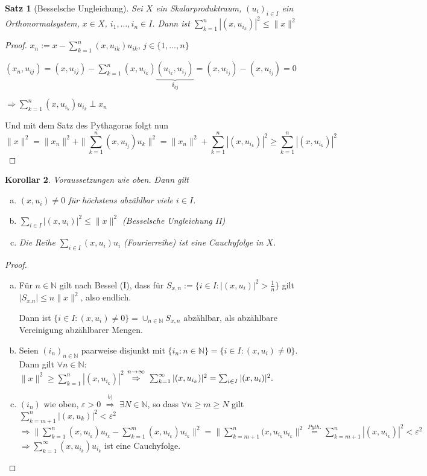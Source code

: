 \documentclass[ngerman]{report}
\theoremstyle{plain}%
\newtheorem{thm}{Satz}[chapter]
\newtheorem{cor}[thm]{Korollar}
\theoremstyle{definition}%
\theoremstyle{myStyle}
\newcommand{\N}{\mathbb{N}}
\newcommand{\norm}[1]{\|#1\|}
\newcommand{\df}[1][]{%
	\overset{#1}{\Rightarrow}
}
\newcommand{\ff}[3]{(#1_#2)_{#2\in#3}}
\begin{document}
	\begin{thm}[Besselsche Ungleichung]
		Sei $X$ ein Skalarproduktraum, $\ff{u}{i}{I}$ ein Orthonormalsystem, $x\in X$, $i_1,\dots,i_n \in I$. Dann ist $\sum_{k=1}^n |(x,u_{i_k})|^2 \leq\norm{x}^2 $
	\end{thm}
	\begin{proof}
		$x_n := x - \sum_{k=1}^n (x,u_{ik}) u_{ik}$, $j\in \{1,\dots,n\}$\par
		$(x_n, u_{ij}) = (x,u_{ij}) - \sum^n_{k=1} (x,u_{i_k}) \underbrace{(u_{i_k},u_{i_j})}_{\delta_{kj}}
		= (x, u_{i_j}) - (x, u_{i_j}) = 0$\par
		$\df \sum^n_{k=1} (x, u_{i_k}) u_{i_k} \perp x_n$\par
		Und mit dem Satz des Pythagoras folgt nun
	$$\norm{x}^2 = \norm{x_n}^2+\|\sum^n_{k=1} (x,u_{i_j})u_k\|^2 = \|x_n\|^2 + \sum^n_{k=1}|(x,u_{i_k})|^2 \geq \sum^n_{k=1} |(x,u_{i_k})|^2$$
	\end{proof}
	
	\begin{cor}
		Voraussetzungen wie oben. Dann gilt\par
		\begin{enumerate}[(a)]
			\item $(x, u_i) \neq 0$ für höchstens abzählbar viele $i\in I$.
			\item $\sum_{i\in I} |(x, u_i)|^2 \leq \norm{x}^2$ (Besselsche Ungleichung II)
			\item Die Reihe $\sum_{i\in I} (x,u_i)u_i$ (Fourierreihe) ist eine Cauchyfolge in $X$.
		\end{enumerate}
	\end{cor}

	\begin{proof}
		\begin{enumerate}[(a)]
			\item Für $n\in\N$ gilt nach Bessel (I), dass für $S_{x,n} := \{ i\in I: |(x, u_i)| ^2 > \frac{1}{n} \}$ 
			gilt $|S_{x.n}| \leq n \norm{x}^2$, also endlich. \par
			Dann ist $\{i \in I: (x,u_i) \neq 0\} = \cup_{n\in\N} S_{x,n}$ abzählbar, als abzählbare Vereinigung abzählbarer Mengen.
			\item Seien $\ff{i}{n}{\N}$ paarweise disjunkt mit $\{i_n : n\in \N\} = \{i\in I: (x,u_i) \neq 0\}$.
			Dann gilt $\forall n\in \N:$\\
			$\norm{x}^2 \geq \sum_{k=1}^n |(x,u_{i_k})|^2$
			$\overset{n\to \infty}{\df}\; \sum_{k=1}^\infty |(x,u_{i_k})|^2 = \sum_{i\in I} |(x,u_i)|^2.$
			\item $(i_n)$ wie oben, $\varepsilon > 0$ 
			$\df[b)]$ $\exists N\in\N$, so dass $\forall n\geq m \geq N$ gilt 
			$\sum_{k = m+1}^n |(x,u_k)|^2 < \varepsilon^2$\\
			$\df \norm{\sum^n_{k=1} (x,u_{i_k})u_{i_k} - \sum^m_{k=1} (x,u_{i_k}) u_{i_k}}^2
			= \norm{ \sum_{k= m+1} ^ n (x, u_{i_k} u_{i_k}}^2 \overset{Pyth.}{=} \sum_{k=m+1}^n |(x,u_{i_k})|^2 < \varepsilon^2$\\
			$\df \sum^\infty_{k=1} (x,u_{i_k})u_{i_k} $ ist eine Cauchyfolge.
		\end{enumerate}
	\end{proof}
\end{document}
